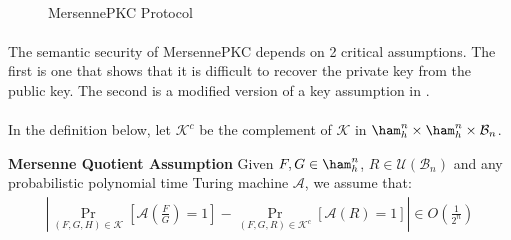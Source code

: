 \paragraph{}
\begin{figure}
\centering
{}
\caption{MersennePKC Protocol} \label{fig:M1}
\end{figure}


\paragraph{}
The semantic security of MersennePKC depends on 2 critical assumptions. The first is one that shows that it is difficult to recover the private key from the public key. The second is a modified version of a key assumption in \cite{aggarwal2018new}.

\paragraph{}
In the definition below, let $\mathcal{K}^c$ be the complement of $\mathcal{K}$ in $\ham_h^n \times \ham_h^n \times \mathcal{B}_n$.

\theoremstyle{definition}
\begin{definition}{\textbf{Mersenne Quotient Assumption}}
Given $F, G \in \ham_h^n$, $R \in \mathcal{U}(\mathcal{B}_n)$ and any probabilistic polynomial time Turing machine $\mathcal{A}$, we assume that:
\begin{align*}
    |\Pr_{(F, G, H) \in \mathcal{K}}[\mathcal{A}(\frac{F}{G}) = 1] - \Pr_{(F, G, R) \in \mathcal{K}^c}[\mathcal{A}(R) = 1]| \in O(\frac{1}{2^n})
\end{align*}
\end{definition}


